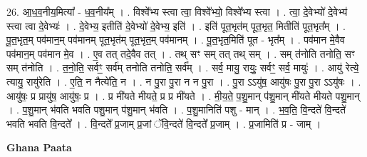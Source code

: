 \documentclass[17pt]{extarticle}
\begin{document}
26. आ॒ध॒व॒नीय॒मित्या᳚ - ध॒व॒नीय᳚म् । . विश्वे᳚भ्य स्त्वा त्वा॒ विश्वे᳚भ्यो॒ विश्वे᳚भ्य स्त्वा । . त्वा॒ दे॒वेभ्यो॑ दे॒वेभ्य॑ स्त्वा त्वा दे॒वेभ्यः॑ । . दे॒वेभ्य॒ इतीति॑ दे॒वेभ्यो॑ दे॒वेभ्य॒ इति॑ । . इति॑ पूत॒भृत॑म् पूत॒भृत॒ मितीति॑ पूत॒भृत᳚म् । . पू॒त॒भृत॒म् पव॑मान॒म् पव॑मानम् पूत॒भृत॑म् पूत॒भृत॒म् पव॑मानम् । . पू॒त॒भृत॒मिति॑ पूत - भृत᳚म् । . पव॑मान मे॒वैव पव॑मान॒म् पव॑मान मे॒व । . ए॒व तत् तदे॒वैव तत् । . तथ् सꣳ सम् तत् तथ् सम् । . सम् त॑नोति तनोति॒ सꣳ सम् त॑नोति । . त॒नो॒ति॒ सर्वꣳ॒॒ सर्व॑म् तनोति तनोति॒ सर्व᳚म् । . सर्व॒ मायु॒ रायुः॒ सर्वꣳ॒॒ सर्व॒ मायुः॑ । . आयु॑ रेत्ये॒ त्यायु॒ रायु॑रेति । . ए॒ति॒ न नैत्ये॑ति॒ न । . न पु॒रा पु॒रा न न पु॒रा । . पु॒रा ऽऽयु॑ष॒ आयु॑षः पु॒रा पु॒रा ऽऽयु॑षः । . आयु॑षः॒ प्र प्रायु॑ष॒ आयु॑षः॒ प्र । . प्र मी॑यते मीयते॒ प्र प्र मी॑यते । . मी॒य॒ते॒ प॒शु॒मान् प॑शु॒मान् मी॑यते मीयते पशु॒मान् । . प॒शु॒मान् भ॑वति भवति पशु॒मान् प॑शु॒मान् भ॑वति । . प॒शु॒मानिति॑ पशु - मान् । . भ॒व॒ति॒ वि॒न्दते॑ वि॒न्दते॑ भवति भवति वि॒न्दते᳚ । . वि॒न्दते᳚ प्र॒जाम् प्र॒जां ॅवि॒न्दते॑ वि॒न्दते᳚ प्र॒जाम् । . प्र॒जामिति॑ प्र - जाम् । \newline

\textbf{Ghana Paata } \newline
\end{document}
